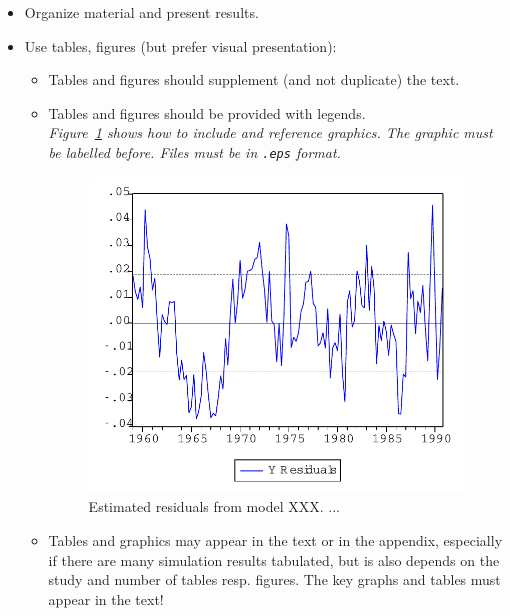 \begin{itemize}

    \item Organize material and present results.

    \item Use tables, figures (but prefer visual presentation):
        \begin{itemize}
            \item Tables and figures should supplement (and not duplicate) the
                text.

            \item Tables and figures should be provided with
            legends.\\
                {\it Figure~\ref{Fig:Resids} shows how to include and reference
                graphics. The graphic must be labelled before. Files must be in
                \texttt{.eps} format.}

                \begin{figure}[ht]
                \begin{center}
                    \includegraphics[scale=0.5,angle=0]{thesis/figures/graph.pdf}
                    \caption{Estimated residuals from model XXX. ...}
                    \label{Fig:Resids}
                \end{center}
                \end{figure}

            \item Tables and graphics may appear in the text or in
                the appendix, especially if there are many simulation results
                tabulated, but is also depends on the study and number of tables resp.
                figures. The key graphs and tables must appear in
                the text!
        \end{itemize}


\end{itemize}

